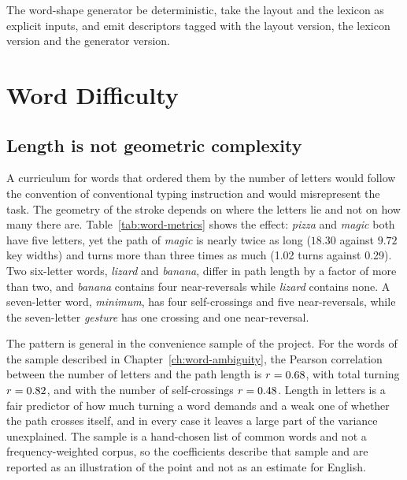 \begin{requirement}\label{req:shape-generation}
The word-shape generator \must{} be deterministic, \must{} take the layout and the lexicon as explicit inputs, and \must{} emit descriptors tagged with the layout version, the lexicon version and the generator version.\evS
\end{requirement}

\chapter{Word Difficulty}\label{ch:word-difficulty}

\section{Length is not geometric complexity}

A curriculum for words that ordered them by the number of letters would follow the convention of conventional typing instruction and would misrepresent the task. The geometry of the stroke depends on where the letters lie and not on how many there are. Table~\ref{tab:word-metrics} shows the effect: \textit{pizza} and \textit{magic} both have five letters, yet the path of \textit{magic} is nearly twice as long ($18.30$ against $9.72$ key widths) and turns more than three times as much (1.02 turns against 0.29). Two six-letter words, \textit{lizard} and \textit{banana}, differ in path length by a factor of more than two, and \textit{banana} contains four near-reversals while \textit{lizard} contains none. A seven-letter word, \textit{minimum}, has four self-crossings and five near-reversals, while the seven-letter \textit{gesture} has one crossing and one near-reversal.

The pattern is general in the convenience sample of the project. For the \lexN{} words of the sample described in Chapter~\ref{ch:word-ambiguity}, the Pearson correlation between the number of letters and the path length is $r=0.68$, with total turning $r=0.82$, and with the number of self-crossings $r=0.48$. Length in letters is a fair predictor of how much turning a word demands and a weak one of whether the path crosses itself, and in every case it leaves a large part of the variance unexplained. The sample is a hand-chosen list of common words and not a frequency-weighted corpus, so the coefficients describe that sample and are reported as an illustration of the point and not as an estimate for English.

